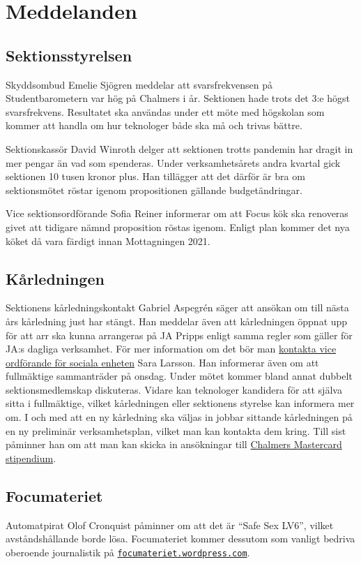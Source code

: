 \documentclass[hidelinks]{sektionsmote}
\begin{document}
\section{Meddelanden}
\subsection{Sektionsstyrelsen}
Skyddsombud Emelie Sjögren meddelar att svarsfrekvensen på Studentbarometern var hög på Chalmers i år.
Sektionen hade trots det 3:e högst svarsfrekvens.
Resultatet ska användas under ett möte med högskolan som kommer att handla om hur teknologer både ska må och trivas bättre.

Sektionskassör David Winroth delger att sektionen trotts pandemin har dragit in mer pengar än vad som spenderas.
Under verksamhetsårets andra kvartal gick sektionen 10 tusen kronor plus.
Han tillägger att det därför är bra om sektionsmötet röstar igenom propositionen gällande budgetändringar.

Vice sektionsordförande Sofia Reiner informerar om att Focus kök ska renoveras givet att tidigare nämnd proposition röstas igenom.
Enligt plan kommer det nya köket då vara färdigt innan Mottagningen 2021.

\subsection{Kårledningen}
Sektionens kårledningskontakt Gabriel Aspegrén säger att ansökan om till nästa års kårledning just har stängt.
Han meddelar även att kårledningen öppnat upp för att arr ska kunna arrangeras på JA Pripps enligt samma regler som gäller för JA:s dagliga verksamhet.
För mer information om det bör man \href{mailto:vso@chalmersstudentkar.se}{kontakta vice ordförande för sociala enheten} Sara Larsson.
Han informerar även om att fullmäktige sammanträder på onsdag.
Under mötet kommer bland annat dubbelt sektionsmedlemskap diskuteras.
Vidare kan teknologer kandidera för att själva sitta i fullmäktige, vilket kårledningen eller sektionens styrelse kan informera mer om.
I och med att en ny kårledning ska väljas in jobbar sittande kårledningen på en ny preliminär verksamhetsplan, vilket man kan kontakta dem kring.
Till sist påminner han om att man kan skicka in ansökningar till \href{https://www.chalmers.se/sv/samverkan/alumn/alumnerbjudanden/chalmers%20mastercard/stipendium/Sidor/default.aspx}{Chalmers Mastercard stipendium}.

\subsection{Focumateriet}
Automatpirat Olof Cronquist påminner om att det är \enquote{Safe Sex LV6}, vilket avståndshållande borde lösa.
Focumateriet kommer dessutom som vanligt bedriva oberoende journalistik på \newline\href{https://focumateriet.wordpress.com}{\texttt{focumateriet.wordpress.com}}.
\end{document}

